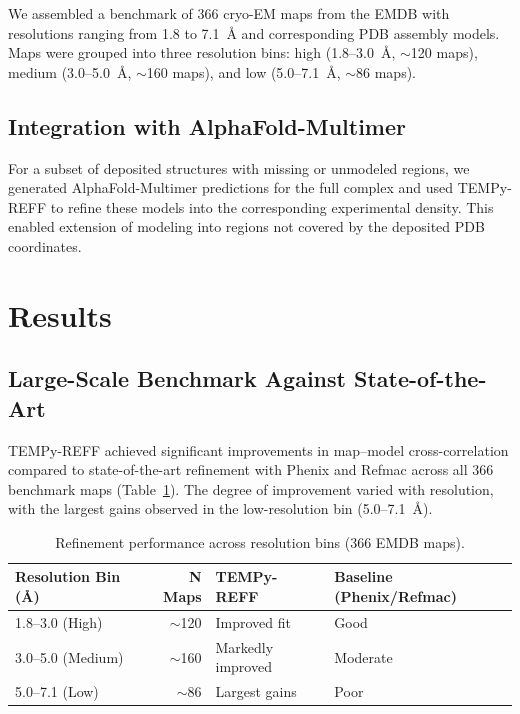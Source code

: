 \documentclass[11pt]{article}
\begin{document}
We assembled a benchmark of 366 cryo-EM maps from the EMDB with resolutions ranging from 1.8 to 7.1~\AA{} and corresponding PDB assembly models. Maps were grouped into three resolution bins: high (1.8--3.0~\AA{}, $\sim$120 maps), medium (3.0--5.0~\AA{}, $\sim$160 maps), and low (5.0--7.1~\AA{}, $\sim$86 maps).

\subsection{Integration with AlphaFold-Multimer}

For a subset of deposited structures with missing or unmodeled regions, we generated AlphaFold-Multimer predictions for the full complex and used TEMPy-REFF to refine these models into the corresponding experimental density. This enabled extension of modeling into regions not covered by the deposited PDB coordinates.

\section{Results}

\subsection{Large-Scale Benchmark Against State-of-the-Art}

TEMPy-REFF achieved significant improvements in map--model cross-correlation compared to state-of-the-art refinement with Phenix and Refmac across all 366 benchmark maps (Table~\ref{tab:benchmark}). The degree of improvement varied with resolution, with the largest gains observed in the low-resolution bin (5.0--7.1~\AA{}).

\begin{table}[ht]
\centering
\caption{Refinement performance across resolution bins (366 EMDB maps).}
\label{tab:benchmark}
\begin{tabular}{lrll}
\toprule
\textbf{Resolution Bin (\AA{})} & \textbf{N Maps} & \textbf{TEMPy-REFF} & \textbf{Baseline (Phenix/Refmac)} \\
\midrule
1.8--3.0 (High) & $\sim$120 & Improved fit & Good \\
3.0--5.0 (Medium) & $\sim$160 & Markedly improved & Moderate \\
5.0--7.1 (Low) & $\sim$86 & Largest gains & Poor \\
\bottomrule
\end{tabular}
\end{table}
\end{document}
